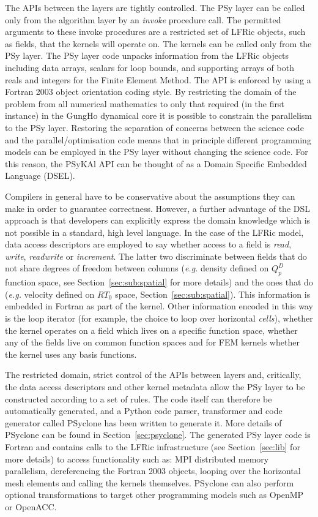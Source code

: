 \documentclass[review,times]{elsarticle}
\begin{document}
The APIs between the layers are tightly controlled. The PSy layer can
be called only from the algorithm layer by an {\em invoke} procedure
call. The permitted arguments to these invoke procedures are a restricted
set of LFRic objects, such as fields, that the kernels will operate on. The
kernels can be called only from the PSy layer. The PSy layer code
unpacks information from the LFRic objects including data
arrays, scalars for loop bounds, and supporting arrays of both reals
and integers for the Finite Element Method.
The API is enforced by using a Fortran 2003 object
orientation coding style. By restricting the
domain of the problem from all numerical mathematics to only that
required (in the first instance) in the GungHo dynamical core it is
possible to constrain the parallelism to the PSy layer. Restoring
the separation of concerns between the science code and the
parallel/optimisation code means that in principle different programming
models can be employed in the PSy layer without changing the science
code. For this reason, the PSyKAl API can be thought of as a Domain Specific
Embedded Language (DSEL).

Compilers in general have to be conservative about the assumptions
they can make in order to guarantee correctness. However, a further
advantage of the DSL approach is that developers can
explicitly express the domain knowledge which is not possible in a
standard, high level language. In the case of the LFRic model, data
access descriptors are employed to say whether access to a field is
{\em read}, {\em write}, {\em readwrite} or {\em increment}. The latter 
two discriminate between fields that do not share degrees 
of freedom between columns ({\em e.g.} density defined on 
$Q_p^D$ function space, see Section~\ref{sec:sub:spatial} for more details) 
and the ones that do ({\em e.g.} velocity defined on $RT_0$ space, 
Section~\ref{sec:sub:spatial}). This information is embedded in
Fortran as part of the kernel. Other information encoded in this way
is the loop iterator (for example, the choice to loop over horizontal {\em cells}), whether the kernel
operates on a field which lives on a specific function space, whether
any of the fields live on common function spaces and for FEM kernels
whether the kernel uses any basis functions. 

The restricted domain, strict control of the APIs between layers and,
critically, the data access descriptors and other kernel metadata
allow the PSy layer to be constructed according to a set of
rules. The code itself can therefore be automatically generated, and 
a Python code parser, transformer and code generator called
PSyclone has been written to generate it. More details of PSyclone can be found in
Section~\ref{sec:psyclone}. The generated PSy layer code is Fortran and
contains calls to the LFRic infrastructure (see Section~\ref{sec:lib} 
for more details) to access functionality such as:
MPI distributed memory parallelism, dereferencing the Fortran 2003 objects,
looping over the horizontal mesh elements and calling the kernels themselves.
PSyclone can also perform optional transformations to target other programming models
such as OpenMP or OpenACC.
\end{document}
